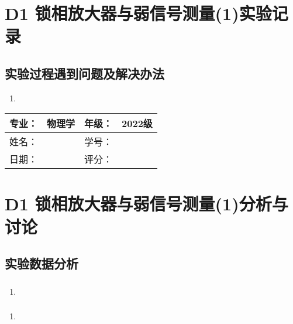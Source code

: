 \documentclass[dvipsnames, svgnames,a4paper,11pt]{article}
\begin{document}
	\section{ D1 锁相放大器与弱信号测量(1)\quad\heiti 实验记录}
	
	\clearpage

	
	\subsection{实验过程遇到问题及解决办法}
	\begin{enumerate}
		\item 
	\end{enumerate}
	
	
	
	\clearpage
	
	\begin{table}
		\renewcommand\arraystretch{1.7}
		\begin{tabularx}{\textwidth}{|X|X|X|X|}
			\hline
			专业：& 物理学 &年级：& 2022级\\
			\hline
			姓名： &  & 学号：& \\
			\hline
			日期：&  & 评分： &\\
			\hline
		\end{tabularx}
	\end{table}
	
	\section{D1 锁相放大器与弱信号测量(1)\quad\heiti 分析与讨论}
	
	\subsection{实验数据分析}
	
	\subsubsection{}
	\begin{enumerate}
		\item 
	\end{enumerate}
	
	\subsubsection{}
	\begin{enumerate}
		\item 
	\end{enumerate}
	
\end{document}
